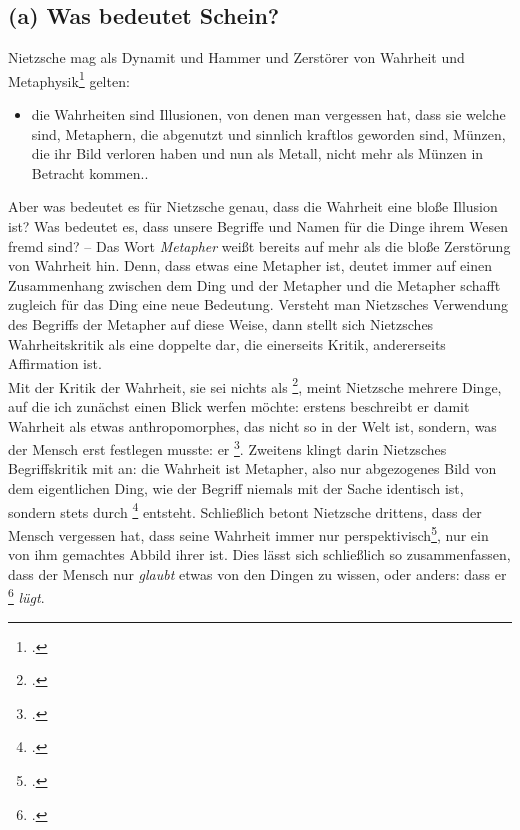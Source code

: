 \documentclass[12pt, a4paper, openany]{report}
\begin{document}
\subsection{(a) Was bedeutet Schein?}
Nietzsche mag als Dynamit und Hammer und Zerstörer von Wahrheit und Metaphysik\footcite[Vgl.][59]{stephan_nietzscheanismus_2019} gelten: 
\begin{itemize}
    \item[] die Wahrheiten sind Illusionen, von denen man vergessen hat, dass sie welche sind, Metaphern, die abgenutzt und sinnlich kraftlos geworden sind, Münzen, die ihr Bild verloren haben und nun als Metall, nicht mehr als Münzen in Betracht kommen.. 
\end{itemize}
Aber was bedeutet es für Nietzsche genau, dass die Wahrheit eine bloße Illusion ist? 
Was bedeutet es, dass unsere Begriffe und Namen für die Dinge ihrem Wesen fremd sind?
-- Das Wort \emph{Metapher} weißt bereits auf mehr als die bloße Zerstörung von Wahrheit hin. 
Denn, dass etwas eine Metapher ist, deutet immer auf einen Zusammenhang zwischen dem Ding und der Metapher und die Metapher schafft zugleich für das Ding eine neue Bedeutung. 
Versteht man Nietzsches Verwendung des Begriffs der Metapher auf diese Weise, dann stellt sich Nietzsches Wahrheitskritik als eine doppelte dar, die einerseits Kritik, andererseits Affirmation ist.\\

Mit der Kritik der Wahrheit, sie sei nichts als \footcite[][880]{nietzsche_geburt_1999}, meint Nietzsche mehrere Dinge, auf die ich zunächst einen Blick werfen möchte: 
erstens beschreibt er damit Wahrheit als etwas anthropomorphes, das nicht so in der Welt ist, sondern, was der Mensch erst festlegen musste: er \footcite[][877]{nietzsche_geburt_1999}.
Zweitens klingt darin Nietzsches Begriffskritik mit an:
die Wahrheit ist Metapher, also nur abgezogenes Bild von dem eigentlichen Ding, wie der Begriff niemals mit der Sache identisch ist, sondern stets durch \footcite[][880]{nietzsche_geburt_1999} entsteht.
Schließlich betont Nietzsche drittens, dass der Mensch vergessen hat, dass seine Wahrheit immer nur perspektivisch\footcite[Vgl.][364]{nietzsche_jenseits_2014}, nur ein von ihm gemachtes Abbild ihrer ist. 
Dies lässt sich schließlich so zusammenfassen, dass der Mensch nur \emph{glaubt} etwas von den Dingen zu wissen, oder anders: dass er \footcite[][881]{nietzsche_geburt_1999} \emph{lügt}.\\
\end{document}
